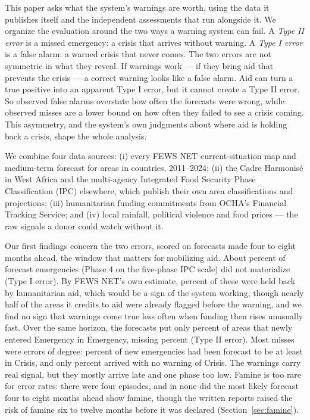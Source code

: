 \documentclass[11pt]{article}
\begin{document}
This paper asks what the system's warnings are worth, using the data it publishes itself and the independent assessments that run alongside it. We organize the evaluation around the two ways a warning system can fail. A \emph{Type II error} is a missed emergency: a crisis that arrives without warning. A \emph{Type I error} is a false alarm: a warned crisis that never comes. The two errors are not symmetric in what they reveal. If warnings work --- if they bring aid that prevents the crisis --- a correct warning looks like a false alarm. Aid can turn a true positive into an apparent Type I error, but it cannot create a Type II error. So observed false alarms overstate how often the forecasts were wrong, while observed misses are a lower bound on how often they failed to see a crisis coming. This asymmetry, and the system's own judgments about where aid is holding back a crisis, shape the whole analysis.

We combine four data sources: (i) every FEWS NET current-situation map and medium-term forecast for \csAreas{} areas in \csCountries{} countries, 2011--2024; (ii) the Cadre Harmonis\'e in West Africa and the multi-agency Integrated Food Security Phase Classification (IPC) elsewhere, which publish their own area classifications and projections; (iii) humanitarian funding commitments from OCHA's Financial Tracking Service; and (iv) local rainfall, political violence and food prices --- the raw signals a donor could watch without it.

Our first findings concern the two errors, scored on forecasts made four to eight months ahead, the window that matters for mobilizing aid. About \tIfailed{} percent of forecast emergencies (Phase 4 on the five-phase IPC scale) did not materialize (Type I error). By FEWS NET's own estimate, \tIfailFlagShare{} percent of these were held back by humanitarian aid, which would be a sign of the system working, though nearly half of the areas it credits to aid were already flagged before the warning, and we find no sign that warnings come true less often when funding then rises unusually fast. Over the same horizon, the forecasts put only \tIIearlyEmergency{} percent of areas that newly entered Emergency in Emergency, missing \tIIearlyMiss{} percent (Type II error). Most misses were errors of degree: \tIIearlyCrisisPlus{} percent of new emergencies had been forecast to be at least in Crisis, and only \tIInoWarning{} percent arrived with no warning of Crisis. The warnings carry real signal, but they mostly arrive late and one phase too low. Famine is too rare for error rates: there were four episodes, and in none did the most likely forecast four to eight months ahead show famine, though the written reports raised the risk of famine six to twelve months before it was declared (Section~\ref{sec:famine}).
\end{document}
